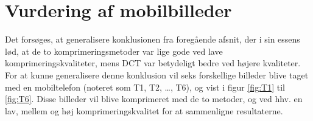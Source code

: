 \section{Vurdering af mobilbilleder}
Det forsøges, at generalisere konklusionen fra foregående afsnit, der i sin essens lød, at de to komprimeringsmetoder var lige gode ved lave komprimeringskvaliteter, mens DCT var betydeligt bedre ved højere kvaliteter. For at kunne generalisere denne konklusion vil seks forskellige billeder blive taget med en mobiltelefon (noteret som T1, T2, …, T6), og vist i figur \ref{fig:T1} til \ref{fig:T6}. Disse billeder vil blive komprimeret med de to metoder, og ved hhv. en lav, mellem og høj komprimeringskvalitet for at sammenligne resultaterne.


